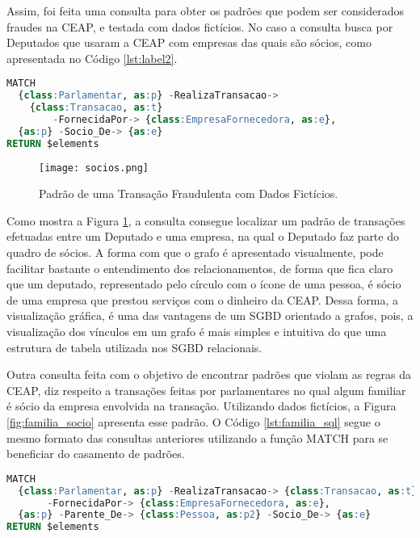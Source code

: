 Assim, foi feita uma consulta para obter os padrões que podem ser considerados fraudes na CEAP, e testada com dados fictícios. No caso a consulta busca por Deputados que usaram a CEAP com empresas das quais são sócios, como apresentada no Código \ref{lst:label2}.

\begin{lstlisting}[label={lst:label2}, caption={Consulta de Relacionamento de uso da CEAP entre Deputados e Empresas nas quais o Deputado é Sócio.},captionpos=b, language=sql]
MATCH 
  {class:Parlamentar, as:p} -RealizaTransacao-> 
  	{class:Transacao, as:t} 
    	-FornecidaPor-> {class:EmpresaFornecedora, as:e},
  {as:p} -Socio_De-> {as:e}
RETURN $elements
\end{lstlisting}

\begin{figure}[H]
\centering
\texttt{[image: socios.png]}
\caption{Padrão de uma Transação Fraudulenta com Dados Fictícios.}
\label{fig:socios}
\end{figure}

Como mostra a Figura \ref{fig:socios}, a consulta consegue localizar um padrão de transações efetuadas entre um Deputado e uma empresa, na qual o Deputado faz parte do quadro de sócios. A forma com que o grafo é apresentado visualmente, pode facilitar bastante o entendimento dos relacionamentos, de forma que fica claro que um deputado, representado pelo círculo com o ícone de uma pessoa, é sócio de uma empresa que prestou serviços com o dinheiro da CEAP. Dessa forma, a visualização gráfica, é uma das vantagens de um SGBD orientado a grafos, pois, a visualização dos vínculos em um grafo é mais simples e intuitiva do que uma estrutura de tabela utilizada nos SGBD relacionais.

Outra consulta feita com o objetivo de encontrar padrões que violam as regras da CEAP, diz respeito a transações feitas por parlamentares no qual algum familiar é sócio da empresa envolvida na transação. Utilizando dados fictícios, a Figura \ref{fig:familia_socio} apresenta esse padrão. O Código \ref{lst:familia_sql} segue o mesmo formato das consultas anteriores utilizando a função MATCH para se beneficiar do casamento de padrões.

\begin{lstlisting}[label={lst:familia_sql}, caption={Consulta de Relacionamento de Uso da CEAP entre Deputados e Empresas, em que um Parente do Deputado é Sócio da Empresa.},captionpos=b, language=sql]
MATCH 
  {class:Parlamentar, as:p} -RealizaTransacao-> {class:Transacao, as:t} 
       -FornecidaPor-> {class:EmpresaFornecedora, as:e},
  {as:p} -Parente_De-> {class:Pessoa, as:p2} -Socio_De-> {as:e}
RETURN $elements
\end{lstlisting}

